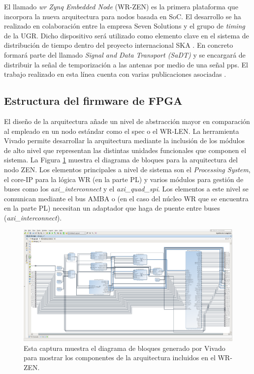 El llamado \textit{\acrlong{wr} Zynq Embedded Node} (WR-ZEN) es la primera 
plataforma que incorpora la nueva arquitectura para nodos basada en SoC. El 
desarrollo se ha realizado en colaboración entre la empresa Seven Solutions y 
el grupo de \textit{timing} de la UGR. Dicho dispositivo será utilizado como 
elemento clave en el sistema de distribución de tiempo dentro del proyecto 
internacional SKA \cite{website:ska}. En concreto formará parte del llamado 
\textit{Signal and Data Transport (SaDT)} y se encargará de distribuir la señal 
de temporización a las antenas por medio de una señal \gls{pps}. El trabajo 
realizado en esta línea cuenta con varias publicaciones asociadas 
\cite{klyone16} \cite{klyone17}.

\subsection{Estructura del firmware de FPGA}

El diseño de la arquitectura añade un nivel de abstracción mayor en comparación 
al empleado en un nodo estándar como el \gls{spec} o el WR-LEN. La herramienta 
Vivado permite desarrollar la arquitectura mediante la inclusión de los módulos 
de alto nivel que representan las distintas unidades funcionales que componen 
el sistema. La Figura \ref*{fig:vivadozen} muestra el diagrama de bloques para 
la arquitectura del nodo ZEN. Los elementos principales a nivel de sistema son 
el \textit{Processing System}, el core-IP para la lógica WR (en la parte PL) y 
varios módulos para gestión de buses como los \textit{axi\_interconnect} y el 
\textit{axi\_quad\_spi}. Los elementos a este nivel se comunican mediante el 
bus 
AMBA o (en el caso del núcleo WR que se encuentra en la parte PL) necesitan un 
adaptador que haga de puente entre buses (\textit{axi\_interconnect}).

\begin{figure}
	\centering
	\includegraphics[width=0.8\linewidth]{imagenes/vivado_zen}
	\caption[Captura de Vivado con el diagrama de bloques de la arquitectura 
	del WR-ZEN]{Esta captura muestra el diagrama de bloques generado por Vivado 
	para mostrar los componentes de la arquitectura incluidos en el WR-ZEN.}
	\label{fig:vivadozen}
\end{figure}

